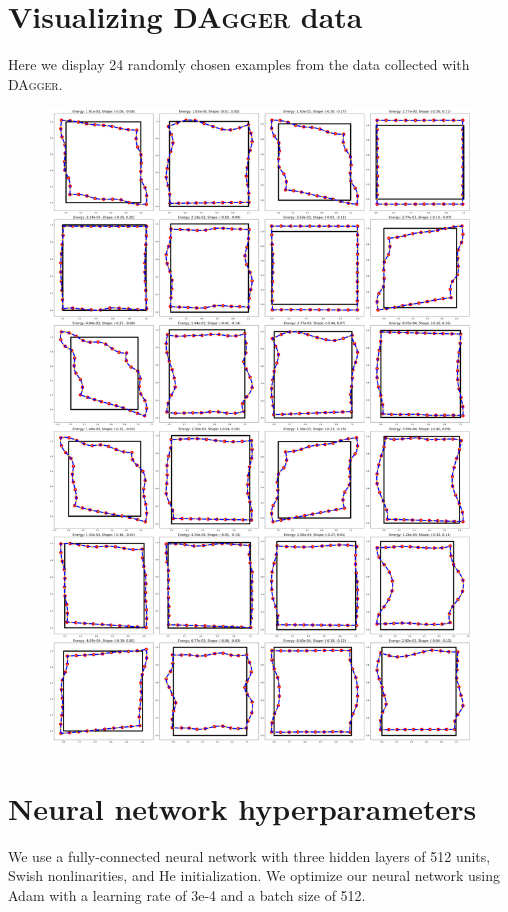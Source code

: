 \clearpage

\section{Visualizing \textsc{DAgger} data}
Here we display 24 randomly chosen examples from the data collected with \textsc{DAgger}.
\begin{figure}[H]
  \centering
  \includegraphics[width=.7\linewidth]{lces/dagger_viz.png}
\end{figure}

\section{Neural network hyperparameters}
We use a fully-connected neural network with three hidden layers of 512 units, Swish nonlinarities, and He initialization.
We optimize our neural network using Adam with a learning rate of 3e-4 and a batch size of 512.


